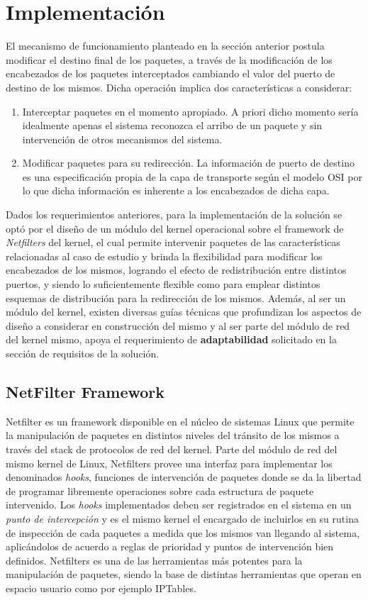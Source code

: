 \section{Implementación}
El mecanismo de funcionamiento planteado en la sección anterior postula modificar el destino final de los paquetes, a través de la modificación de los encabezados de los paquetes interceptados cambiando el valor del puerto de destino de los mismos. Dicha operación implica dos características a considerar:

\begin{enumerate}
\item Interceptar paquetes en el momento apropiado. A priori dicho momento sería idealmente apenas el sistema reconozca el arribo de un paquete y sin intervención de otros mecanismos del sistema.
\item Modificar paquetes para su redirección. La información de puerto de destino es una especificación propia de la capa de transporte según el modelo OSI por lo que dicha información es inherente a los encabezados de dicha capa.
\end{enumerate}

Dados los requerimientos anteriores, para la implementación de la solución se optó por el diseño de un módulo del kernel operacional sobre el framework de \emph{Netfilters} del kernel, el cual permite intervenir paquetes de las características relacionadas al caso de estudio y brinda la flexibilidad para modificar los encabezados de los mismos, logrando el efecto de redistribución entre distintos puertos, y siendo lo suficientemente flexible como para emplear distintos esquemas de distribución para la redirección de los mismos. Además, al ser un módulo del kernel, existen diversas guías técnicas que profundizan los aspectos de diseño a considerar en construcción del mismo y al ser parte del módulo de red del kernel mismo, apoya el requerimiento de \textbf{adaptabilidad} solicitado en la sección de requisitos de la solución.

\subsection{NetFilter Framework}
Netfilter \cite{report:netfilterModule} es un framework disponible en el núcleo de sistemas Linux que permite la manipulación de paquetes en distintos niveles del tránsito de los mismos a través del stack de protocolos de red del kernel. Parte del módulo de red del mismo kernel de Linux, Netfilters provee una interfaz para implementar los denominados \emph{hooks}, funciones de intervención de paquetes donde se da la libertad de programar libremente operaciones sobre cada estructura de paquete intervenido. Los \emph{hooks} implementados deben ser registrados en el sistema en un \emph{punto de intercepción} y es el mismo kernel el encargado de incluirlos en su rutina de inspección de cada paquetes a medida que los mismos van llegando al sistema, aplicándolos de acuerdo a reglas de prioridad y puntos de intervención bien definidos. Netfilters es una de las herramientas más potentes para la manipulación de paquetes, siendo la base de distintas herramientas que operan en espacio usuario como por ejemplo IPTables.

